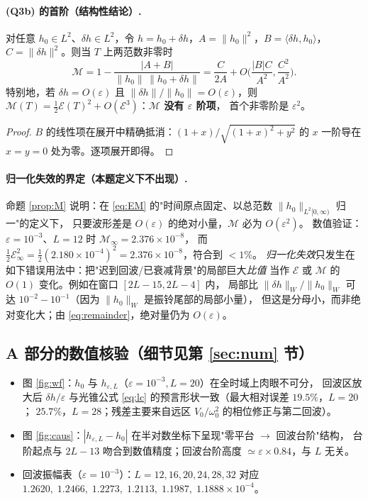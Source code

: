 \paragraph{(Q3b) 的首阶（结构性结论）.}
\begin{proposition}\label{prop:M}
对任意 $h_0\in L^2$、$\delta h\in L^2$，令 $h=h_0+\delta h$，$A=\|h_0\|^2$，$B=\langle\delta h,h_0\rangle$，
$C=\|\delta h\|^2$。则当 $T$ 上两范数非零时
\begin{equation}
\mathcal M=1-\frac{|A+B|}{\|h_0\|\,\|h_0+\delta h\|}
=\frac{C}{2A}+O\!\Big(\frac{|B|C}{A^2},\frac{C^2}{A^2}\Big).
\label{eq:Mexpand}
\end{equation}
特别地，若 $\delta h=O(\varepsilon)$ 且 $\|\delta h\|/\|h_0\|=O(\varepsilon)$，则
$\mathcal M(T)=\frac12\mathcal E(T)^2+O(\mathcal E^3)$：\textbf{$\mathcal M$ 没有 $\varepsilon$ 阶项}，
首个非零阶是 $\varepsilon^2$。
\end{proposition}
\begin{proof}
$B$ 的线性项在展开中精确抵消：$(1+x)/\sqrt{(1+x)^2+y^2}$ 的 $x$ 一阶导在 $x=y=0$ 处为零。逐项展开即得。
\end{proof}

\paragraph{归一化失效的界定（本题定义下不出现）.}
命题 \ref{prop:M} 说明：在 \eqref{eq:EM} 的"时间原点固定、以总范数 $\|h_0\|_{L^2[0,\infty)}$ 归一"的定义下，
只要波形差是 $O(\varepsilon)$ 的绝对小量，$\mathcal M$ 必为 $O(\varepsilon^2)$。
数值验证：$\varepsilon=10^{-3}$、$L=12$ 时 $\mathcal M_\infty=2.376\times10^{-8}$，
而 $\frac12\mathcal E_\infty^2=\frac12(2.180\times10^{-4})^2=2.376\times10^{-8}$，符合到 $<1\%$。
\emph{归一化失效}只发生在如下错误用法中：把"迟到回波/已衰减背景"的局部巨大\emph{比值}
当作 $\mathcal E$ 或 $\mathcal M$ 的 $O(1)$ 变化。例如在窗口 $[2L-15,2L-4]$ 内，
局部比 $\|\delta h\|_W/\|h_0\|_W$ 可达 $10^{-2}\!-\!10^{-1}$（因为 $\|h_0\|_W$ 是振铃尾部的局部小量），
但这是分母小，而非绝对变化大；由 \eqref{eq:remainder}，绝对量仍为 $O(\varepsilon)$。

\subsection{A 部分的数值核验（细节见第 \ref{sec:num} 节）}

\begin{itemize}\itemsep2pt
\item 图 \ref{fig:wf}：$h_0$ 与 $h_{\varepsilon,L}$（$\varepsilon=10^{-3},L=20$）在全时域上肉眼不可分，
回波区放大后 $\delta h/\varepsilon$ 与光锥公式 \eqref{eq:lc} 的预言形状一致（最大相对误差 $19.5\%$，$L=20$；
$25.7\%$，$L=28$；残差主要来自远区 $V_0/\omega_0^2$ 的相位修正与第二回波）。
\item 图 \ref{fig:caus}：$|h_{\varepsilon,L}-h_0|$ 在半对数坐标下呈现"零平台 $\to$ 回波台阶"结构，
台阶起点与 $2L-13$ 吻合到数值精度；回波台阶高度 $\simeq\varepsilon\times0.84$，与 $L$ 无关。
\item 回波振幅表（$\varepsilon=10^{-3}$）：$L=12,16,20,24,28,32$ 对应
$1.2620,\;1.2466,\;1.2273,\;1.2113,\;1.1987,\;1.1888\times10^{-4}$。
\end{itemize}

